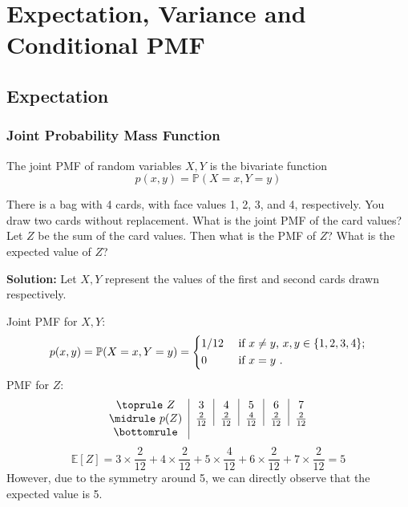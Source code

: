 \chapter{Expectation, Variance and Conditional PMF}

\section{Expectation}
\subsection{Joint Probability Mass Function}
The joint PMF of random variables \(X, Y\) is the bivariate function 
\[
    p(x, y) = \mathbb{P}(X = x, Y = y)
\]

\begin{eg}
    There is a bag with 4 cards, with face values 1, 2, 3, and 4, respectively. You draw two cards without replacement. What is the joint PMF of the card values? Let \(Z\) be the sum of the card values. Then what is the PMF of \(Z\)? What is the expected value of \(Z\)?

    \textbf{Solution:} 
    Let \(X, Y\) represent the values of the first and second cards drawn respectively.

    Joint PMF for \(X, Y\):
    \[
        p(x, y) = \mathbb{P}(X = x, Y = y) = \begin{dcases}
            1/12 &\text{ if \(x \neq y\), \(x, y \in \{1, 2, 3,4\}\)}  ;\\
            0 &\text{ if \(x = y\) }.
        \end{dcases}
    \]
    PMF for \(Z\):
    \[
        \begin{tabular}{c|c|c|c|c|c}
            \toprule
                \(Z\)  & 3 & 4 & 5 & 6 & 7  \\
            \midrule
                \(p(Z)\) & \(\frac{2}{12}\) & \(\frac{2}{12}\) & \(\frac{4}{12}\) & \(\frac{2}{12}\) & \(\frac{2}{12}\)  \\
            \bottomrule
        \end{tabular}
    \]
    \[
        \mathbb{E}[Z] = 3 \times \dfrac{2}{12} + 4 \times \dfrac{2}{12} + 5 \times \dfrac{4}{12} + 6 \times \dfrac{2}{12} + 7 \times \dfrac{2}{12} = 5
    \]
    However, due to the symmetry around 5, we can directly observe that the expected value is 5.
\end{eg}

